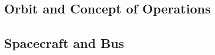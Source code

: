 \documentclass[12pt,journal]{IEEEtran}
\begin{document}
\subsection{Orbit and Concept of Operations}

\subsection{Spacecraft and Bus}

\end{document}
